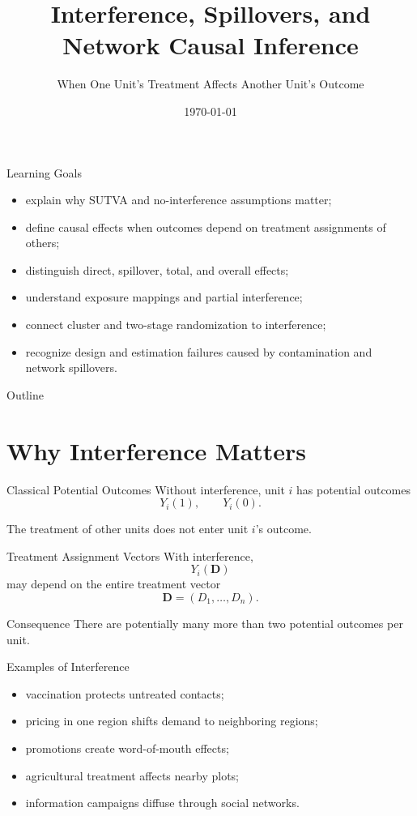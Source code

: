 \documentclass[aspectratio=169,11pt]{beamer}
\title[Interference and Spillovers]{Interference, Spillovers, and Network Causal Inference}
\subtitle{When One Unit's Treatment Affects Another Unit's Outcome}
\date{\today}
\begin{document}
\begin{frame}
\titlepage
\end{frame}

\begin{frame}{Learning Goals}
\begin{itemize}
\item explain why SUTVA and no-interference assumptions matter;
\item define causal effects when outcomes depend on treatment assignments of others;
\item distinguish direct, spillover, total, and overall effects;
\item understand exposure mappings and partial interference;
\item connect cluster and two-stage randomization to interference;
\item recognize design and estimation failures caused by contamination and network spillovers.
\end{itemize}
\end{frame}

\begin{frame}{Outline}
\tableofcontents
\end{frame}

\section{Why Interference Matters}

\begin{frame}{Classical Potential Outcomes}
Without interference, unit \(i\) has potential outcomes
\[
Y_i(1),\qquad Y_i(0).
\]

The treatment of other units does not enter unit \(i\)'s outcome.
\end{frame}

\begin{frame}{Treatment Assignment Vectors}
With interference,
\[
Y_i(\mathbf D)
\]
may depend on the entire treatment vector
\[
\mathbf D=(D_1,\ldots,D_n).
\]

\begin{alertblock}{Consequence}
There are potentially many more than two potential outcomes per unit.
\end{alertblock}
\end{frame}

\begin{frame}{Examples of Interference}
\begin{itemize}
\item vaccination protects untreated contacts;
\item pricing in one region shifts demand to neighboring regions;
\item promotions create word-of-mouth effects;
\item agricultural treatment affects nearby plots;
\item information campaigns diffuse through social networks.
\end{itemize}
\end{frame}
\end{document}
